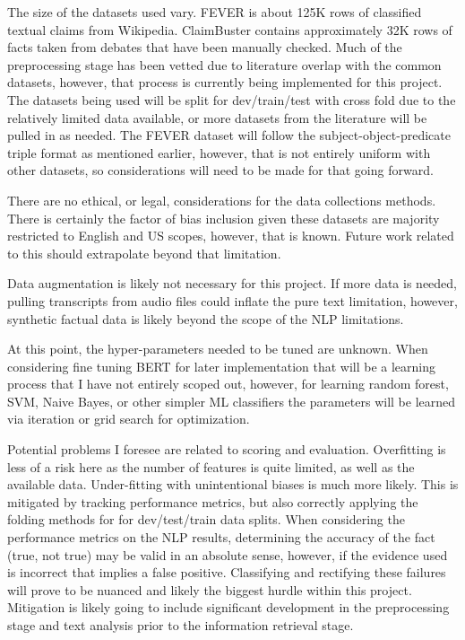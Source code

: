 \documentclass[11pt,letterpaper]{article}
\begin{document}
{

The size of the datasets used vary. FEVER is about 125K rows of classified textual claims from Wikipedia. ClaimBuster contains approximately 32K rows of facts taken from debates that have been manually checked. Much of the preprocessing stage has been vetted due to literature overlap with the common datasets, however, that process is currently being implemented for this project. The datasets being used will be split for dev/train/test with cross fold due to the relatively limited data available, or more datasets from the literature will be pulled in as needed. The FEVER dataset will follow the subject-object-predicate triple format as mentioned earlier, however, that is not entirely uniform with other datasets, so considerations will need to be made for that going forward.

There are no ethical, or legal, considerations for the data collections methods. There is certainly the factor of bias inclusion given these datasets are majority restricted to English and US scopes, however, that is known. Future work related to this should extrapolate beyond that limitation.

Data augmentation is likely not necessary for this project. If more data is needed, pulling transcripts from audio files could inflate the pure text limitation, however, synthetic factual data is likely beyond the scope of the NLP limitations.

At this point, the hyper-parameters needed to be tuned are unknown. When considering fine tuning BERT for later implementation that will be a learning process that I have not entirely scoped out, however, for learning random forest, SVM, Naive Bayes, or other simpler ML classifiers the parameters will be learned via iteration or grid search for optimization.

Potential problems I foresee are related to scoring and evaluation. Overfitting is less of a risk here as the number of features is quite limited, as well as the available data. Under-fitting with unintentional biases is much more likely. This is mitigated by tracking performance metrics, but also correctly applying the folding methods for for dev/test/train data splits. When considering the performance metrics on the NLP results, determining the accuracy of the fact (true, not true) may be valid in an absolute sense, however, if the evidence used is incorrect that implies a false positive. Classifying and rectifying these failures will prove to be nuanced and likely the biggest hurdle within this project. Mitigation is likely going to include significant development in the preprocessing stage and text analysis prior to the information retrieval stage.



}
\end{document}
